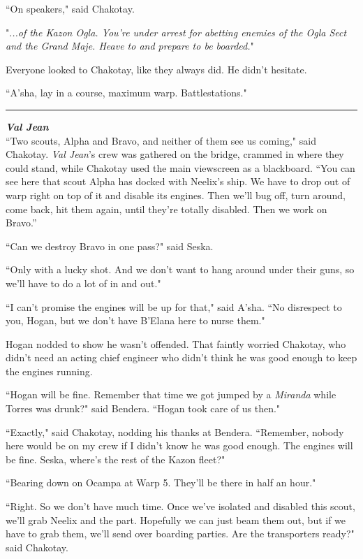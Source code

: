\documentclass[twoside,letterpaper,12pt]{memoir}
\begin{document}
``On speakers," said Chakotay.

".\textit{..of the Kazon Ogla. You're under arrest for abetting enemies of the Ogla Sect and the Grand Maje. Heave to and prepare to be boarded.}"

Everyone looked to Chakotay, like they always did. He didn't hesitate.

``A'sha, lay in a course, maximum warp. Battlestations."

\fancybreak{\rule{3cm}{0.4 pt}}
\noindent\textit{\textbf{Val Jean}}\\

``Two scouts, Alpha and Bravo, and neither of them see us coming," said Chakotay. \textit{Val Jean}'s crew was gathered on the bridge, crammed in where they could stand, while Chakotay used the main viewscreen as a blackboard. ``You can see here that scout Alpha has docked with Neelix's ship. We have to drop out of warp right on top of it and disable its engines. Then we'll bug off, turn around, come back, hit them again, until they’re totally disabled. Then we work on Bravo.”

``Can we destroy Bravo in one pass?" said Seska.

``Only with a lucky shot. And we don't want to hang around under their guns, so we'll have to do a lot of in and out."

``I can't promise the engines will be up for that," said A'sha. ``No disrespect to you, Hogan, but we don't have B'Elana here to nurse them."

Hogan nodded to show he wasn't offended. That faintly worried Chakotay, who didn't need an acting chief engineer who didn't think he was good enough to keep the engines running.

``Hogan will be fine. Remember that time we got jumped by a \textit{Miranda} while Torres was drunk?" said Bendera. ``Hogan took care of us then."

``Exactly," said Chakotay, nodding his thanks at Bendera. ``Remember, nobody here would be on my crew if I didn't know he was good enough. The engines will be fine. Seska, where's the rest of the Kazon fleet?"

``Bearing down on Ocampa at Warp 5. They'll be there in half an hour."

``Right. So we don't have much time. Once we've isolated and disabled this scout, we'll grab Neelix and the part. Hopefully we can just beam them out, but if we have to grab them, we'll send over boarding parties. Are the transporters ready?" said Chakotay.
\end{document}

